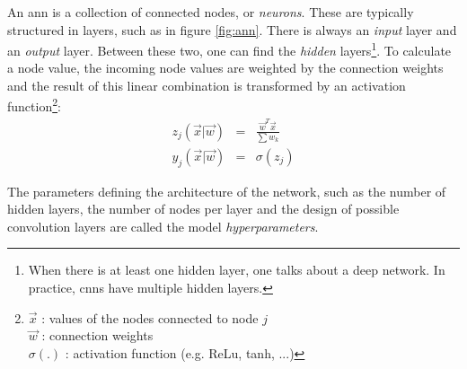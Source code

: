 \begin{SCfigure}[][h!]
    \centering
    
    \caption{
        Concept of an Artificial (feed-forward) Neural Network. 
        The illustrated network has 4 layers: the input layer, two hidden layers and the output layer.
        The hidden layers first perform a feature extraction transformation on the input data.
        Based on these features, the ouput layer can generate the model result.
        This simple network illustrates different characteristics of neural networks: 
        First, this concept is flexible.
        Architectures with more than two hidden layers are common. 
        The number of neurons in the hidden layers is another degree of flexibility. 
        Second, a neural network has a high number of parameters. This small network consists of $n\times m + m \times t + t \times k$ weights $w$ and the activation functions in each layer.
        The concept of a \acrfull{cnn} is to reduce the number of weights in certain layers by imposing these to represent a single convolution filter.
        \label{fig:ann}
        }
\end{SCfigure}

\par{
    An \acrshort{ann} is a collection of connected nodes, or \textit{neurons}. 
    These are typically structured in layers, such as in figure \ref{fig:ann}. 
    There is always an \textit{input} layer and an \textit{output} layer. Between these two, one can find the \textit{hidden} layers\footnote{When there is at least one hidden layer, one talks about a deep network. In practice, \acrshort{cnn}s have multiple hidden layers.}.
    To calculate a node value, the incoming node values are weighted by the connection weights and the result of this linear combination is transformed by an activation function\footnote{
        $\vec{x}$ : values of the nodes connected to node $j$\\
        $\vec{w}$ : connection weights\\
        $\sigma(.)$ : activation function (e.g. ReLu, tanh, ...)
    }:
    \begin{eqnarray}
        z_j(\vec{x} | \vec{w}) &=& \frac{\vec{w}^T\vec{x}}{\sum w_k} \\
        y_j(\vec{x} | \vec{w}) &=& \sigma(z_j)
    \end{eqnarray}
}
\par{
    The parameters defining the architecture of the network, such as the number of hidden layers, the number of nodes per layer and the design of possible convolution layers are called the model \textit{hyperparameters}.
}

